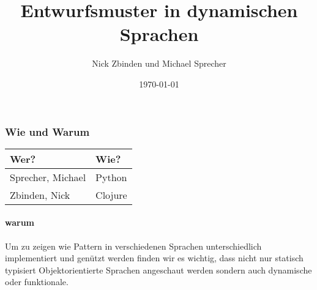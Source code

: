 \documentclass{beamer}
\begin{document}
\title{Entwurfsmuster in dynamischen Sprachen}
\author{Nick Zbinden und Michael Sprecher}
\date{\today}

\begin{frame}
\titlepage
\end{frame}

\begin{frame}\frametitle{Wie und Warum}
\begin{center}
  \begin{tabular}{l  l}
    Wer? & Wie?\\
    \hline
    Sprecher, Michael & Python\\
    Zbinden, Nick & Clojure\\
  \end{tabular}

  \paragraph{warum}

    Um zu zeigen wie Pattern in verschiedenen Sprachen
    unterschiedlich implementiert und genützt werden finden wir es
    wichtig, dass nicht nur statisch typisiert Objektorientierte
    Sprachen angeschaut werden sondern auch dynamische oder funktionale.
\end{center}
\end{frame}



\begin{frame}
  
\end{frame}


























\end{document}
